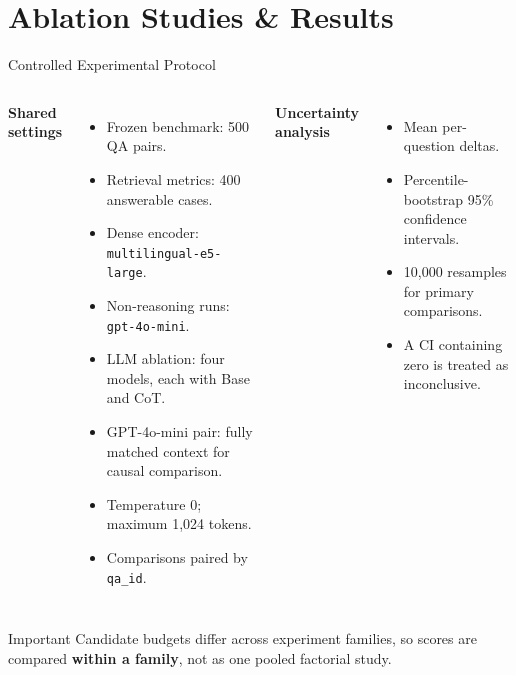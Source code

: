 \section{Ablation Studies \& Results}

\begin{frame}{Controlled Experimental Protocol}
\scriptsize
\begin{columns}[T]
    \textbf{Shared settings}
    \begin{itemize}
      \item Frozen benchmark: 500 QA pairs.
      \item Retrieval metrics: 400 answerable cases.
      \item Dense encoder: \texttt{multilingual-e5-large}.
      \item Non-reasoning runs: \texttt{gpt-4o-mini}.
      \item LLM ablation: four models, each with Base and CoT.
      \item GPT-4o-mini pair: fully matched context for causal comparison.
      \item Temperature 0; maximum 1,024 tokens.
      \item Comparisons paired by \texttt{qa\_id}.
    \end{itemize}
    \textbf{Uncertainty analysis}
    \begin{itemize}
      \item Mean per-question deltas.
      \item Percentile-bootstrap 95\% confidence intervals.
      \item 10,000 resamples for primary comparisons.
      \item A CI containing zero is treated as inconclusive.
    \end{itemize}
\end{columns}
\vspace{0.2cm}
\begin{alertblock}{Important}
Candidate budgets differ across experiment families, so scores are compared \textbf{within a family}, not as one pooled factorial study.
\end{alertblock}
\end{frame}


